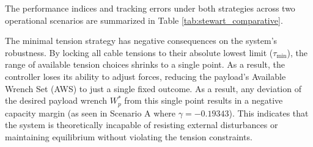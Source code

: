 The performance indices and tracking errors under both strategies across two operational scenarios are summarized in Table \ref{tab:stewart_comparative}.


The minimal tension strategy has negative consequences on the system's robustness. By locking all cable tensions to their absolute lowest limit ($\tau_{\min}$), the range of available tension choices shrinks to a single point. As a result, the controller loses its ability to adjust forces, reducing the payload's Available Wrench Set (AWS) to just a single fixed outcome. \cite{yang_robust_2025}
As a result, any deviation of the desired payload wrench $W_p^*$ from this single point results in a negative capacity margin (as seen in Scenario A where $\gamma = -0.19343$). This indicates that the system is theoretically incapable of resisting external disturbances or maintaining equilibrium without violating the tension constraints.


